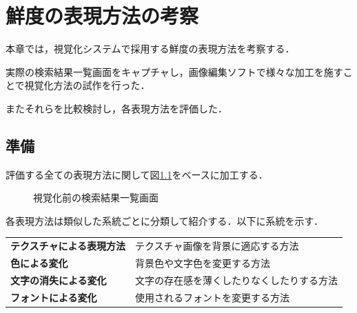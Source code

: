 \chapter{鮮度の表現方法の考察}
\label{chap:verification}

本章では，視覚化システムで採用する鮮度の表現方法を考察する．

実際の検索結果一覧画面をキャプチャし，画像編集ソフトで様々な加工を施すことで視覚化方法の試作を行った．

またそれらを比較検討し，各表現方法を評価した．

\newpage

\section{準備}

評価する全ての表現方法に関して図\ref{fig:ver-base}をベースに加工する．

\begin{figure}[htbp]
  \begin{center}
  \end{center}
  \caption{視覚化前の検索結果一覧画面}
  \label{fig:ver-base}
\end{figure}

各表現方法は類似した系統ごとに分類して紹介する．以下に系統を示す．

\begin{table}[htbp]
  \begin{tabular}{ll}
    {\bf テクスチャによる表現方法} & テクスチャ画像を背景に適応する方法 \\
    {\bf 色による変化} & 背景色や文字色を変更する方法 \\
    {\bf 文字の消失による変化} & 文字の存在感を薄くしたりなくしたりする方法 \\
    {\bf フォントによる変化} & 使用されるフォントを変更する方法 \\
  \end{tabular}
\end{table}

